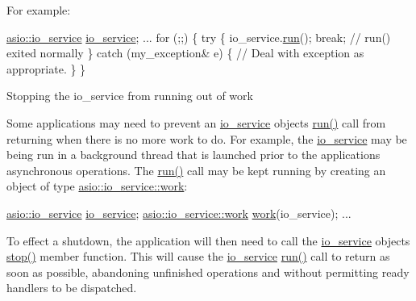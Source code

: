 For example\+:


\begin{DoxyCode}
\hyperlink{classasio_1_1io__service}{asio::io\_service} \hyperlink{classasio_1_1io__service_ac843d46058d711a8ce0cc5f98acc116e}{io\_service};
...
for (;;)
\{
  \textcolor{keywordflow}{try}
  \{
    io\_service.\hyperlink{classasio_1_1io__service_ac84bed0d1dd061bc71010ba1228439da}{run}();
    \textcolor{keywordflow}{break}; \textcolor{comment}{// run() exited normally}
  \}
  \textcolor{keywordflow}{catch} (my\_exception& e)
  \{
    \textcolor{comment}{// Deal with exception as appropriate.}
  \}
\}
\end{DoxyCode}


\begin{DoxyParagraph}{Stopping the io\+\_\+service from running out of work}

\end{DoxyParagraph}
Some applications may need to prevent an \hyperlink{classasio_1_1io__service}{io\+\_\+service} object\textquotesingle{}s \hyperlink{classasio_1_1io__service_ac84bed0d1dd061bc71010ba1228439da}{run()} call from returning when there is no more work to do. For example, the \hyperlink{classasio_1_1io__service}{io\+\_\+service} may be being run in a background thread that is launched prior to the application\textquotesingle{}s asynchronous operations. The \hyperlink{classasio_1_1io__service_ac84bed0d1dd061bc71010ba1228439da}{run()} call may be kept running by creating an object of type \hyperlink{classasio_1_1io__service_1_1work}{asio\+::io\+\_\+service\+::work}\+:


\begin{DoxyCode}
 \hyperlink{classasio_1_1io__service}{asio::io\_service} \hyperlink{classasio_1_1io__service_ac843d46058d711a8ce0cc5f98acc116e}{io\_service};
\hyperlink{classasio_1_1io__service_1_1work}{asio::io\_service::work} \hyperlink{classasio_1_1io__service_ab4659d3bc91cdcd7ca7a05329278ee88}{work}(io\_service);
... 
\end{DoxyCode}


To effect a shutdown, the application will then need to call the \hyperlink{classasio_1_1io__service}{io\+\_\+service} object\textquotesingle{}s \hyperlink{classasio_1_1io__service_afd2dad56dd1d0d1adfbcf4d9f1c3912f}{stop()} member function. This will cause the \hyperlink{classasio_1_1io__service}{io\+\_\+service} \hyperlink{classasio_1_1io__service_ac84bed0d1dd061bc71010ba1228439da}{run()} call to return as soon as possible, abandoning unfinished operations and without permitting ready handlers to be dispatched.

